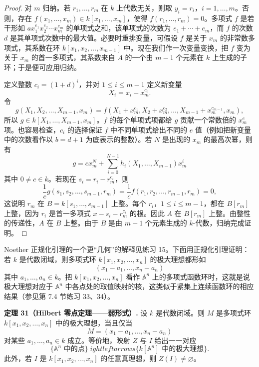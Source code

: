 \begin{proof}
	对 $m$ 归纳。若 $r_1,
	\ldots,r_m$ 在 $k$ 上代数无关，则取 $y_i=r_i$，$i=1,
	\ldots,m$。否则，存在 $f(x_1,
	\ldots,x_m)\in k[x_1,
	\ldots,x_m]$，使得 $f(r_1,
	\ldots,r_m)=0$。多项式 $f$ 是若干形如 $ax_1^{e_1}x_2^{e_2}\cdots x_m^{e_m}$ 的单项式之和，该单项式的次数为 $e_1+\cdots+e_m$，而 $f$ 的次数 $d$ 是其单项式次数中的最大值。必要时重排变量，可假设 $f$ 是关于 $x_m$ 的非常数多项式，其系数在环 $k[x_1,x_2,
	\ldots,x_{m-1}]$ 中。现在我们作一次变量变换，把 $f$ 变为关于 $x_m$ 的首一多项式，其系数来自 $A$ 的一个由 $m-1$ 个元素在 $k$ 上生成的子环；于是便可应用归纳。
	
	定义整数 $c_i=(1+d)^i$，并对 $1\le i\le m-1$ 定义新变量
	\[
	X_i=x_i-x_m^{c_i}.
	\]
	令
	\[
	g(X_1,X_2,
	\ldots,X_{m-1},x_m)=f(X_1+x_m^{c_1},X_2+x_m^{c_2},
	\ldots,X_{m-1}+x_m^{c_{m-1}},x_m),
	\]
	所以 $g\in k[X_1,
	\ldots,X_{m-1},x_m]$。$f$ 的每个单项式项都给 $g$ 贡献一个常数倍的 $x_m^e$ 项。也容易检查，$c_i$ 的选择保证 $f$ 中不同单项式给出不同的 $e$ 值（例如把新变量中的次数看作以 $b=d+1$ 为底表示的整数）。若 $N$ 是出现的 $x_m$ 的最高次幂，则有
	\[
	g=cx_m^N+\sum_{i=0}^{N-1}h_i(X_1,
	\ldots,X_{m-1})x_m^i
	\]
	其中 $0\ne c\in k$。若现在 $s_i=r_i-r_m^{c_i}$，则
	\[
	\frac1c g(s_1,s_2,
	\ldots,s_{m-1},r_m)=\frac1c f(r_1,r_2,
	\ldots,r_{m-1},r_m)=0,
	\]
	这说明 $r_m$ 在 $B=k[s_1,
	\ldots,s_{m-1}]$ 上整。每个 $r_i$，$1\le i\le m-1$，都在 $B[r_m]$ 上整，因为 $r_i$ 是首一多项式 $x-s_i-r_m^{c_i}$ 的根。因此 $A$ 在 $B[r_m]$ 上整。由整性的传递性，$A$ 在 $B$ 上整。由于 $B$ 是由 $m-1$ 个元素生成的 $k$-代数，归纳完成证明。
\end{proof}

Noether 正规化引理的一个更“几何”的解释见练习 15。下面用正规化引理证明：若 $k$ 是代数闭域，则多项式环 $k[x_1,x_2,
\ldots,x_n]$ 的极大理想都形如
\[
(x_1-a_1,
\ldots,x_n-a_n)
\]
其中 $a_1,
\ldots,a_n\in k$。把 $k[x_1,x_2,
\ldots,x_n]$ 看作 $\mathbb A^n$ 上的多项式函数环时，这就是说极大理想对应于 $\mathbb A^n$ 中各点处的取值映射的核，这类似于紧集上连续函数环的相应结果（参见第 7.4 节练习 33、34）。

\noindent\textbf{定理 31（Hilbert 零点定理——弱形式）.} 设 $k$ 是代数闭域。则 $M$ 是多项式环 $k[x_1,x_2,
\ldots,x_n]$ 中的极大理想，当且仅当
\[
M=(x_1-a_1,
\ldots,x_n-a_n)
\]
对某些 $a_1,
\ldots,a_n\in k$ 成立。等价地，映射 $Z$ 与 $I$ 给出一一对应
\[
\{\mathbb A^n\text{ 中的点}\}
\;
ightleftarrows
\{k[\mathbb A^n]\text{ 中的极大理想}\}.
\]
此外，若 $I$ 是 $k[x_1,x_2,
\ldots,x_n]$ 的任意真理想，则 $Z(I)\ne\varnothing$。

